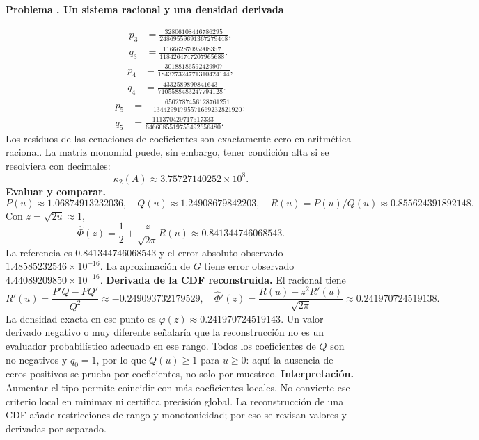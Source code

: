 \documentclass[11pt,a4paper]{article}
\theoremstyle{definition}
\newcounter{problema}
\newenvironment{resuelto}[1]{\refstepcounter{problema}\par\medskip\Needspace{6\baselineskip}\textbf{Problema \theproblema. #1}\par}{\par\medskip}
\begin{document}
\begin{resuelto}{Un sistema racional y una densidad derivada}
\[\]
\[
\begin{aligned}p_3&=\frac{32806108446786295}{24869559691367279448},\\q_3&=\frac{11666287095908357}{1184264747207965688}.\end{aligned}
\]
\[
\begin{aligned}p_4&=\frac{30188186592429907}{184327324771310424144},\\q_4&=\frac{4332589899841643}{7105588483247794128}.\end{aligned}
\]
\[
\begin{aligned}p_5&=-\frac{6502787456128761251}{13442991795571669232821920},\\q_5&=\frac{111370429717517333}{6466085519755492656480}.\end{aligned}
\]
Los residuos de las ecuaciones de coeficientes son exactamente cero en aritmética racional. La matriz monomial puede, sin embargo, tener condición alta si se resolviera con decimales:
\[
\kappa_2(A)\approx3.75727140252\times10^{8}.
\]
\textbf{Evaluar y comparar.}
\[
P(u)\approx1.06874913232036,\quad Q(u)\approx1.24908679842203,\quad R(u)=P(u)/Q(u)\approx0.855624391892148.
\]
Con $z=\sqrt{2u}\approx1$,
\[
\widehat\Phi(z)=\frac12+\frac z{\sqrt{2\pi}}R(u)\approx0.841344746068543.
\]
La referencia es $0.841344746068543$ y el error absoluto observado $1.48585232546\times10^{-16}$. La aproximación de $G$ tiene error observado $4.44089209850\times10^{-16}$.
\textbf{Derivada de la CDF reconstruida.} El racional tiene
\[
R\prime(u)=\frac{P\prime Q-PQ\prime}{Q^2}\approx-0.249093732179529,\quad
\widehat\Phi\prime(z)=\frac{R(u)+z^2R\prime(u)}{\sqrt{2\pi}}\approx0.241970724519138.
\]
La densidad exacta en ese punto es $\varphi(z)\approx0.241970724519143$. Un valor derivado negativo o muy diferente señalaría que la reconstrucción no es un evaluador probabilístico adecuado en ese rango.
Todos los coeficientes de $Q$ son no negativos y $q_0=1$, por lo que $Q(u)\ge1$ para $u\ge0$: aquí la ausencia de ceros positivos se prueba por coeficientes, no solo por muestreo.
\textbf{Interpretación.} Aumentar el tipo permite coincidir con más coeficientes locales. No convierte ese criterio local en minimax ni certifica precisión global. La reconstrucción de una CDF añade restricciones de rango y monotonicidad; por eso se revisan valores y derivadas por separado.
\end{resuelto}
\end{document}
